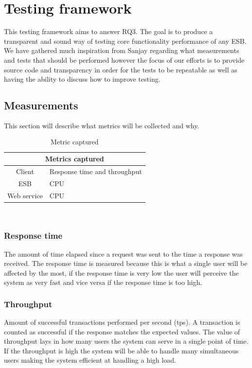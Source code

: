 

\section{Testing framework}
This testing framework aims to answer RQ3. The goal is to produce a transparent and sound way of testing core functionality \cite{lit review} performance of any ESB. 
We have gathered much inspiration from Sanjay \cite{Sanjay} regarding what measurements and tests that should be performed however the focus of our efforts is to provide source code and transparency in order for the tests to be repeatable as well as having the ability to discuss how to improve testing.

\subsection{Measurements}
This section will describe what metrics will be collected and why.\\

\begin{table}
	\caption{Metric captured}
	\begin{tabular}{c l}
		\multicolumn{2}{c}{Metrics captured} \\
		\hline
		Client & Response time and throughput \\
		ESB & CPU \\ 
		Web service &  CPU \\
		\hline
	\end{tabular} \\
\end{table}
\subsubsection{Response time}
The amount of time elapsed since a request was sent to the time a response was received. 
The response time is measured because this is what a single user will be affected by the most, if the response time is very low the user will perceive the system as very fast and vice versa if the response time is too high.
\subsubsection{Throughput}
Amount of successful transactions performed per second (tps). A transaction is counted as successful if the response matches the expected values.
The value of throughput lays in how many users the system can serve in a single point of time. If the throughput is high the system will be able to handle many simultaneous users making the system efficient at handling a high load.



